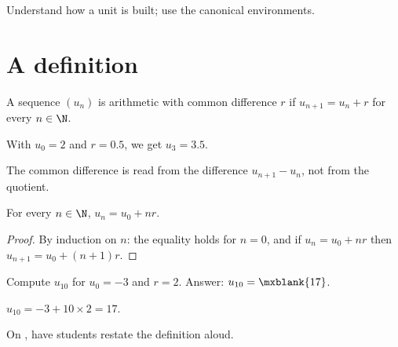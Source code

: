 \begin{objectives}
Understand how a unit is built; use the canonical environments.
\end{objectives}
\section{A definition}
\begin{definition}
A sequence $(u_n)$ is arithmetic with common difference $r$ if $u_{n+1}=u_n+r$ for every $n\in\N$.
\end{definition}
\begin{example}
With $u_0=2$ and $r=\num{0,5}$, we get $u_3=\num{3,5}$. 
\end{example}
\begin{pitfall}
The common difference is read from the difference $u_{n+1}-u_n$, not from the quotient.
\end{pitfall}
\begin{theorem}
For every $n\in\N$, $u_n=u_0+nr$.
\end{theorem}
\begin{proof}
By induction on $n$: the equality holds for $n=0$, and if $u_n=u_0+nr$ then $u_{n+1}=u_0+(n+1)r$.
\end{proof}
\begin{exercise}
Compute $u_{10}$ for $u_0=-3$ and $r=2$. Answer: $u_{10}=\mxblank{17}$.
\end{exercise}
\begin{solution}
$u_{10}=-3+10\times2=17$.
\end{solution}
\begin{figurebox}
\end{figurebox}
\begin{teachernote}
On , have students restate the definition aloud.
\end{teachernote}
